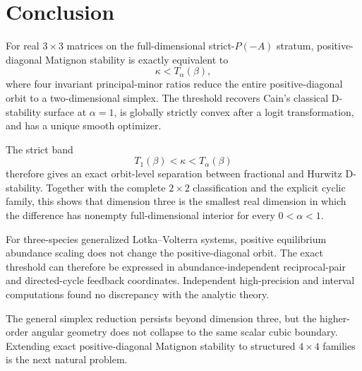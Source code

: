 \section{Conclusion}

For real \(3\times3\) matrices on the full-dimensional strict-\(P(-A)\) stratum, positive-diagonal Matignon stability is exactly equivalent to
\[
\kappa<T_\alpha(\beta),
\]
where four invariant principal-minor ratios reduce the entire positive-diagonal orbit to a two-dimensional simplex. The threshold recovers Cain's classical D-stability surface at \(\alpha=1\), is globally strictly convex after a logit transformation, and has a unique smooth optimizer.

The strict band
\[
T_1(\beta)<\kappa<T_\alpha(\beta)
\]
therefore gives an exact orbit-level separation between fractional and Hurwitz D-stability. Together with the complete \(2\times2\) classification and the explicit cyclic family, this shows that dimension three is the smallest real dimension in which the difference has nonempty full-dimensional interior for every \(0<\alpha<1\).

For three-species generalized Lotka--Volterra systems, positive equilibrium abundance scaling does not change the positive-diagonal orbit. The exact threshold can therefore be expressed in abundance-independent reciprocal-pair and directed-cycle feedback coordinates. Independent high-precision and interval computations found no discrepancy with the analytic theory.

The general simplex reduction persists beyond dimension three, but the higher-order angular geometry does not collapse to the same scalar cubic boundary. Extending exact positive-diagonal Matignon stability to structured \(4\times4\) families is the next natural problem.
